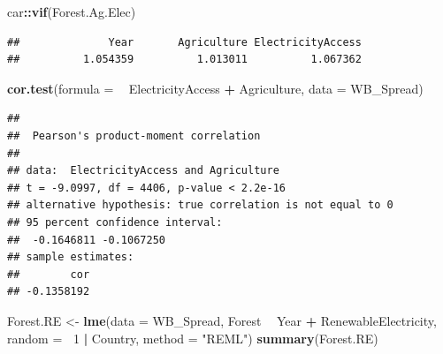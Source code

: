 \documentclass[12pt,]{article}
\newenvironment{Shaded}{\begin{snugshade}}{\end{snugshade}}
\newcommand{\KeywordTok}[1]{\textcolor[rgb]{0.13,0.29,0.53}{\textbf{#1}}}
\newcommand{\DataTypeTok}[1]{\textcolor[rgb]{0.13,0.29,0.53}{#1}}
\newcommand{\DecValTok}[1]{\textcolor[rgb]{0.00,0.00,0.81}{#1}}
\newcommand{\StringTok}[1]{\textcolor[rgb]{0.31,0.60,0.02}{#1}}
\newcommand{\OperatorTok}[1]{\textcolor[rgb]{0.81,0.36,0.00}{\textbf{#1}}}
\newcommand{\NormalTok}[1]{#1}
\begin{document}
\begin{Shaded}
\begin{Highlighting}[]
\NormalTok{car}\OperatorTok{::}\KeywordTok{vif}\NormalTok{(Forest.Ag.Elec)}
\end{Highlighting}
\end{Shaded}

\begin{verbatim}
##              Year       Agriculture ElectricityAccess 
##          1.054359          1.013011          1.067362
\end{verbatim}

\begin{Shaded}
\begin{Highlighting}[]
\KeywordTok{cor.test}\NormalTok{(}\DataTypeTok{formula =} \OperatorTok{~}\StringTok{ }\NormalTok{ElectricityAccess }\OperatorTok{+}\StringTok{ }\NormalTok{Agriculture,}
         \DataTypeTok{data =}\NormalTok{ WB_Spread)}
\end{Highlighting}
\end{Shaded}

\begin{verbatim}
## 
##  Pearson's product-moment correlation
## 
## data:  ElectricityAccess and Agriculture
## t = -9.0997, df = 4406, p-value < 2.2e-16
## alternative hypothesis: true correlation is not equal to 0
## 95 percent confidence interval:
##  -0.1646811 -0.1067250
## sample estimates:
##        cor 
## -0.1358192
\end{verbatim}

\begin{Shaded}
\begin{Highlighting}[]
\NormalTok{Forest.RE <-}\StringTok{ }\KeywordTok{lme}\NormalTok{(}\DataTypeTok{data =}\NormalTok{ WB_Spread, }
\NormalTok{                    Forest }\OperatorTok{~}\StringTok{ }\NormalTok{Year }\OperatorTok{+}\StringTok{ }\NormalTok{RenewableElectricity,}
                    \DataTypeTok{random =} \OperatorTok{~}\DecValTok{1} \OperatorTok{|}\StringTok{ }\NormalTok{Country,}
                    \DataTypeTok{method =} \StringTok{"REML"}\NormalTok{)}
\KeywordTok{summary}\NormalTok{(Forest.RE)}
\end{Highlighting}
\end{Shaded}
\end{document}
